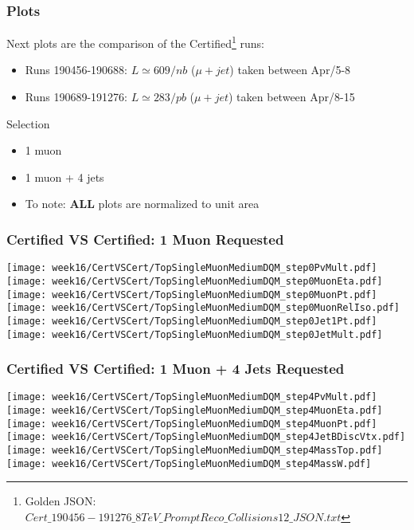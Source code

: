 \documentclass{beamer}
\begin{document}
\begin{frame}
\frametitle{Plots}
Next plots are the comparison of the Certified\footnote{Golden JSON: \href{https://cms-service-dqm.web.cern.ch/cms-service-dqm/CAF/certification/Collisions12/8TeV/Prompt/Cert_190456-191276\_8TeV\_PromptReco\_Collisions12\_JSON.txt}{$Cert\_190456-191276\_8TeV\_PromptReco\_Collisions12\_JSON.txt$}} runs:
\begin{itemize}
\item Runs 190456-190688: $L\simeq 609/nb$ ($\mu+jet$) taken between Apr/5-8
\item Runs 190689-191276: $L\simeq 283/pb$ ($\mu+jet$) taken between Apr/8-15
\end{itemize}
Selection
\begin{itemize}
\item 1 muon
\item 1 muon + 4 jets
\end{itemize}
\begin{itemize}
\item To note: \textbf{ALL} plots are normalized to unit area
\end{itemize}
\end{frame}




\begin{frame}
\frametitle{Certified VS Certified: 1 Muon Requested}
\hspace{-0.7cm}
\texttt{[image: week16/CertVSCert/TopSingleMuonMediumDQM\_step0PvMult.pdf]}
\texttt{[image: week16/CertVSCert/TopSingleMuonMediumDQM\_step0MuonEta.pdf]}
\texttt{[image: week16/CertVSCert/TopSingleMuonMediumDQM\_step0MuonPt.pdf]}\\
\hspace{-0.7cm}
\texttt{[image: week16/CertVSCert/TopSingleMuonMediumDQM\_step0MuonRelIso.pdf]}
\texttt{[image: week16/CertVSCert/TopSingleMuonMediumDQM\_step0Jet1Pt.pdf]}
\texttt{[image: week16/CertVSCert/TopSingleMuonMediumDQM\_step0JetMult.pdf]}
\end{frame}


\begin{frame}
\frametitle{Certified VS Certified: 1 Muon + 4 Jets Requested}
\hspace{-0.7cm}
\texttt{[image: week16/CertVSCert/TopSingleMuonMediumDQM\_step4PvMult.pdf]}
\texttt{[image: week16/CertVSCert/TopSingleMuonMediumDQM\_step4MuonEta.pdf]}
\texttt{[image: week16/CertVSCert/TopSingleMuonMediumDQM\_step4MuonPt.pdf]}\\
\hspace{-0.7cm}
\texttt{[image: week16/CertVSCert/TopSingleMuonMediumDQM\_step4JetBDiscVtx.pdf]}
\texttt{[image: week16/CertVSCert/TopSingleMuonMediumDQM\_step4MassTop.pdf]}
\texttt{[image: week16/CertVSCert/TopSingleMuonMediumDQM\_step4MassW.pdf]}
\end{frame}
\end{document}
